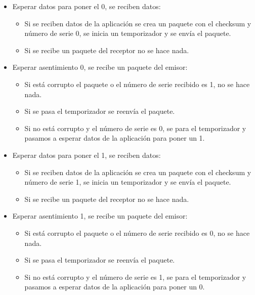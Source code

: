 \documentclass[12pt, twoside, openright]{report} %
\begin{document}
      \begin{itemize}
      \item
        Esperar datos para poner el 0, se reciben datos:

        \begin{itemize}
        \item
          Si se reciben datos de la aplicación se crea un paquete con el
          checksum y número de serie 0, se inicia un temporizador y se
          envía el paquete.
        \item
          Si se recibe un paquete del receptor no se hace nada.
        \end{itemize}
      \item
        Esperar asentimiento 0, se recibe un paquete del emisor:

        \begin{itemize}
        \item
          Si está corrupto el paquete o el número de serie recibido es
          1, no se hace nada.
        \item
          Si se pasa el temporizador se reenvía el paquete.
        \item
          Si no está corrupto y el número de serie es 0, se para el
          temporizador y pasamos a esperar datos de la aplicación para
          poner un 1.
        \end{itemize}
      \item
        Esperar datos para poner el 1, se reciben datos:

        \begin{itemize}
        \item
          Si se reciben datos de la aplicación se crea un paquete con el
          checksum y número de serie 1, se inicia un temporizador y se
          envía el paquete.
        \item
          Si se recibe un paquete del receptor no se hace nada.
        \end{itemize}
      \item
        Esperar asentimiento 1, se recibe un paquete del emisor:

        \begin{itemize}
        \item
          Si está corrupto el paquete o el número de serie recibido es
          0, no se hace nada.
        \item
          Si se pasa el temporizador se reenvía el paquete.
        \item
          Si no está corrupto y el número de serie es 1, se para el
          temporizador y pasamos a esperar datos de la aplicación para
          poner un 0.
        \end{itemize}
      \end{itemize}
\end{document}
